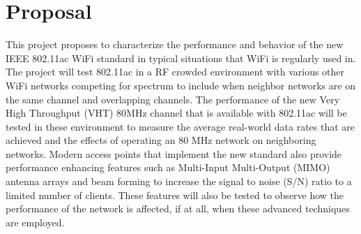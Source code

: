 \section{Proposal}

This project proposes to characterize the performance and behavior of the new IEEE 802.11ac WiFi standard in typical situations that WiFi is regularly used in. The project will test 802.11ac in a RF crowded environment with various other WiFi networks competing for spectrum to include when neighbor networks are on the same channel and overlapping channels. The performance of the new Very High Throughput (VHT) 80MHz channel that is available with 802.11ac will be tested in these environment to measure the average real-world data rates that are achieved and the effects of operating an 80 MHz network on neighboring networks. Modern access points that implement the new standard also provide performance enhancing features such as Multi-Input Multi-Output (MIMO) antenna arrays and beam forming to increase the signal to noise (S/N) ratio to a limited number of clients. These features will also be tested to observe how the performance of the network is affected, if at all, when these advanced techniques are employed. 